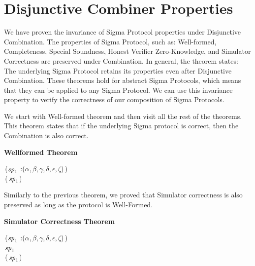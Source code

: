 \section{Disjunctive Combiner Properties}
We have proven the invariance of Sigma Protocol properties under Disjunctive Combination. The properties of Sigma Protocol, such as: Well-formed, Completeness, Special Soundness, Honest Verifier Zero-Knowledge, and Simulator Correctness are preserved under Combination. In general, the theorem states: The underlying Sigma Protocol retains its properties even after Disjunctive Combination. These theorems hold for abstract Sigma Protocols, which means that they can be applied to any Sigma Protocol. We can use this invariance property to verify the correctness of our composition of Sigma Protocols.

We start with Well-formed theorem and then visit all the rest of the theorems. This theorem states that if the underlying Sigma protocol is correct, then the Combination is also correct.

\textbf{Wellformed Theorem}
\begin{holmath}
    \,(\ensuremath{\HOLFreeVar{sp}\sb{\mathrm{1}}} :(\ensuremath{\alpha},\,\ensuremath{\beta},\,\ensuremath{\gamma},\,\ensuremath{\delta},\,\ensuremath{\epsilon},\,\ensuremath{\zeta})\,)\,\HOLSymConst{\HOLTokenImp{}}\\
\,(\,\ensuremath{\HOLFreeVar{sp}\sb{\mathrm{1}}})
\end{holmath}  

Similarly to the previous theorem, we proved that Simulator correctness is also preserved as long as the protocol is Well-Formed.

\textbf{Simulator Correctness Theorem}\\
\begin{holmath}
    \,(\ensuremath{\HOLFreeVar{sp}\sb{\mathrm{1}}} :(\ensuremath{\alpha},\,\ensuremath{\beta},\,\ensuremath{\gamma},\,\ensuremath{\delta},\,\ensuremath{\epsilon},\,\ensuremath{\zeta})\,)\,\HOLSymConst{\HOLTokenConj{}}\\
\,\ensuremath{\HOLFreeVar{sp}\sb{\mathrm{1}}}\,\HOLSymConst{\HOLTokenImp{}}\\
\,(\,\ensuremath{\HOLFreeVar{sp}\sb{\mathrm{1}}})
\end{holmath}  

